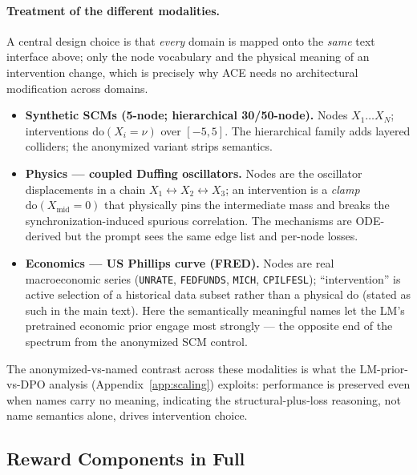 \documentclass[twoside]{article}
\theoremstyle{plain}
\theoremstyle{definition}
\theoremstyle{remark}
\begin{document}
\paragraph{Treatment of the different modalities.} A central design choice is that \emph{every} domain is mapped onto the \emph{same} text interface above; only the node vocabulary and the physical meaning of an intervention change, which is precisely why ACE needs no architectural modification across domains.
\begin{itemize}[leftmargin=1.5em]
\item \textbf{Synthetic SCMs (5-node; hierarchical 30/50-node).} Nodes $X_1\dots X_N$; interventions $\mathrm{do}(X_i{=}\nu)$ over $[-5,5]$. The hierarchical family adds layered colliders; the anonymized variant strips semantics.
\item \textbf{Physics --- coupled Duffing oscillators.} Nodes are the oscillator displacements in a chain $X_1\!\leftrightarrow\!X_2\!\leftrightarrow\!X_3$; an intervention is a \emph{clamp} $\mathrm{do}(X_\text{mid}{=}0)$ that physically pins the intermediate mass and breaks the synchronization-induced spurious correlation. The mechanisms are ODE-derived but the prompt sees the same edge list and per-node losses.
\item \textbf{Economics --- US Phillips curve (FRED).} Nodes are real macroeconomic series (\texttt{UNRATE}, \texttt{FEDFUNDS}, \texttt{MICH}, \texttt{CPILFESL}); ``intervention'' is active selection of a historical data subset rather than a physical $\mathrm{do}$ (stated as such in the main text). Here the semantically meaningful names let the LM's pretrained economic prior engage most strongly --- the opposite end of the spectrum from the anonymized SCM control.
\end{itemize}
The anonymized-vs-named contrast across these modalities is what the LM-prior-vs-DPO analysis (Appendix~\ref{app:scaling}) exploits: performance is preserved even when names carry no meaning, indicating the structural-plus-loss reasoning, not name semantics alone, drives intervention choice.

\subsection{Reward Components in Full}
\label{app:reward}
\end{document}

